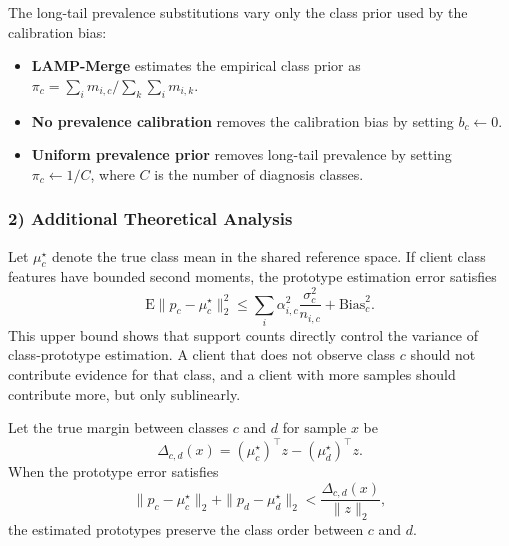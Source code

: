\documentclass[letterpaper]{article} %
\begin{document}
The long-tail prevalence substitutions vary only the class prior used by the calibration bias:
\begin{itemize}
\setlength{\itemsep}{0pt}
\item \textbf{LAMP-Merge} estimates the empirical class prior as \(\pi_c=\sum_i m_{i,c}/\sum_k\sum_i m_{i,k}\).
\item \textbf{No prevalence calibration} removes the calibration bias by setting \(b_c\leftarrow0\).
\item \textbf{Uniform prevalence prior} removes long-tail prevalence by setting \(\pi_c\leftarrow 1/C\), where \(C\) is the number of diagnosis classes.
\end{itemize}

\subsubsection{2) Additional Theoretical Analysis}
Let $\mu_c^\star$ denote the true class mean in the shared reference space. If client class features have bounded second moments, the prototype estimation error satisfies
\begin{equation}
\mathrm{E}\|p_c-\mu_c^\star\|_2^2
\le
\sum_i \alpha_{i,c}^2\frac{\sigma_c^2}{n_{i,c}}
+ \mathrm{Bias}_c^2.
\end{equation}
This upper bound shows that support counts directly control the variance of class-prototype estimation. A client that does not observe class $c$ should not contribute evidence for that class, and a client with more samples should contribute more, but only sublinearly.

Let the true margin between classes $c$ and $d$ for sample $x$ be
\begin{equation}
\Delta_{c,d}(x)=(\mu_c^\star)^\top z-(\mu_d^\star)^\top z.
\end{equation}
When the prototype error satisfies
\begin{equation}
\|p_c-\mu_c^\star\|_2+\|p_d-\mu_d^\star\|_2
<
\frac{\Delta_{c,d}(x)}{\|z\|_2},
\end{equation}
the estimated prototypes preserve the class order between $c$ and $d$.
\end{document}
